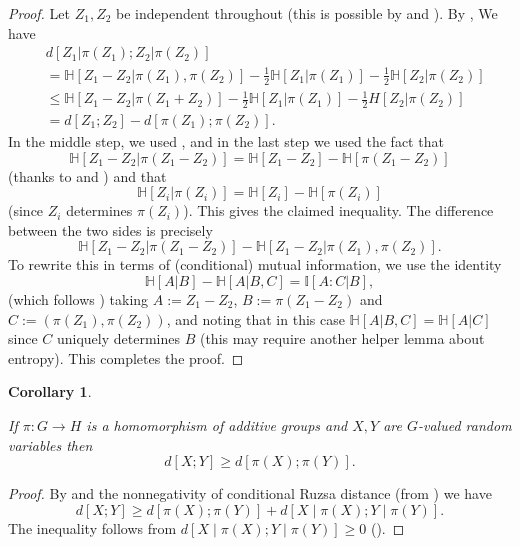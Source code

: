 \documentclass[10pt,a4paper]{article}
\newtheorem{corollary}[theorem]{Corollary}
\newcommand{\lean}[1]{}
\newcommand{\uses}[1]{}
\newcommand{\leanok}{}
\newcommand{\bbH}{\mathbb{H}}
\newcommand{\bbI}{\mathbb{I}}
\begin{document}
\begin{proof}\uses{ruz-copy, independent-exist, submodularity,conditional-mutual-alt,chain-rule,relabeled-entropy, cond-dist-alt}\leanok
  Let $Z_1,Z_2$ be independent throughout (this is possible by  and ).  By , We have
  \begin{align*}
    & d[Z_1  |\pi(Z_1); Z_2 |\pi(Z_2)] \\
    & = \bbH[Z_1 - Z_2 | \pi(Z_1),\pi(Z_2)] - \tfrac{1}{2} \bbH[Z_1 | \pi(Z_1)] - \tfrac{1}{2} \bbH[Z_2 | \pi(Z_2)] \\
    & \leq  \bbH[Z_1 - Z_2 | \pi(Z_1+Z_2)]  - \tfrac{1}{2} \bbH[Z_1 | \pi(Z_1)] - \tfrac{1}{2}H[Z_2 | \pi(Z_2)] \\
    & = d[Z_1;Z_2] - d[\pi(Z_1);\pi(Z_2)].
  \end{align*}
  In the middle step, we used , and in the last step we used the fact that
  \[\bbH[Z_1 - Z_2 |  \pi(Z_1-Z_2)] = \bbH[Z_1 - Z_2] - \bbH[\pi(Z_1-Z_2)]\]
  (thanks to  and ) and that
  \[\bbH[Z_i| \pi(Z_i)] = \bbH[Z_i] - \bbH[\pi(Z_i)]\] (since $Z_i$ determines $\pi(Z_i)$).
  This gives the claimed inequality. The difference between the two sides is precisely
  \[\bbH[Z_1 - Z_2  | \pi(Z_1 - Z_2)] - \bbH[Z_1 - Z_2  | \pi(Z_1),\pi(Z_2)].\]
  To rewrite this in terms of (conditional) mutual information, we use the identity
  \[\bbH[A|B] - \bbH[A | B,C] = \bbI[A : C | B],\]
  (which follows )
  taking
  $A := Z_1 - Z_2$, $B := \pi(Z_1 - Z_2)$ and $C := (\pi(Z_1),\pi(Z_{2}))$, and noting that in this case $\bbH[A | B,C] = \bbH[A | C]$ since $C$ uniquely determines $B$ (this may require another helper lemma about entropy).
  This completes the proof.
\end{proof}


\begin{corollary}\label{fibring-ineq}
 \lean{rdist_of_hom_le} \leanok
If $\pi:G\to H$ is a homomorphism of additive groups and $X,Y$ are $G$-valued random variables then
\[d[X;Y]\geq d[\pi(X);\pi(Y)].\]
\end{corollary}

\begin{proof}
\uses{fibring-ident, ruzsa-nonneg}\leanok
By  and the nonnegativity of conditional Ruzsa distance (from ) we have
\[d[X;Y]\geq d[\pi(X);\pi(Y)]+d[X\mid \pi(X);Y\mid \pi(Y)].\]
The inequality follows from $d[X\mid \pi(X);Y\mid \pi(Y)]\geq 0$ ().
\end{proof}
\end{document}
